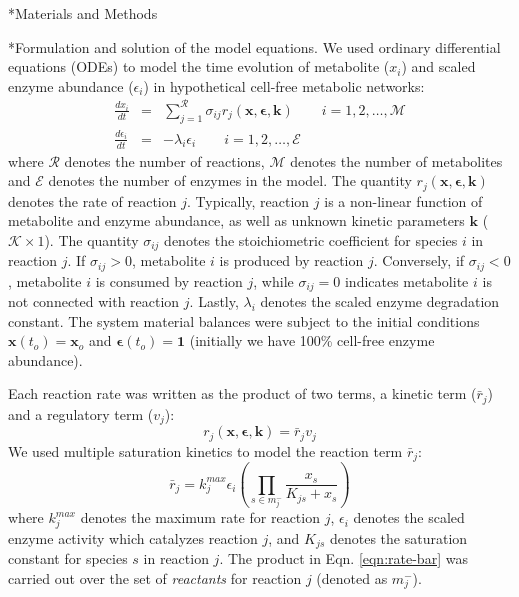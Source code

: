\documentclass[12pt]{article}
\makeatletter
\renewcommand\subsection{\@startsection
	{subsection}{2}{0mm}
	{-0.05in}
	{-0.5\baselineskip}
	{\normalfont\normalsize\bfseries}}
\renewcommand\section{\@startsection
	{subsection}{2}{0mm}
	{-0.2in}
	{0.05\baselineskip}
	{\normalfont\large\bfseries}}
\makeatother
\begin{document}
\clearpage

\section*{Materials and Methods}

\subsection*{Formulation and solution of the model equations.}
We used ordinary differential equations (ODEs) to model the time evolution of metabolite ($x_{i}$) and scaled enzyme abundance ($\epsilon_{i}$) in hypothetical cell-free metabolic networks:
\begin{eqnarray}
	\frac{dx_{i}}{dt} & = & \sum_{j = 1}^{\mathcal{R}}\sigma_{ij}r_{j}\left(\mathbf{x},\mathbf{\epsilon},\mathbf{k}\right)\qquad{i=1,2,\hdots,\mathcal{M}}\\
	\frac{d\epsilon_{i}}{dt} & = & -\lambda_{i}\epsilon_{i}\qquad{i = 1,2,\hdots,\mathcal{E}}
\end{eqnarray}where $\mathcal{R}$ denotes the number of reactions, $\mathcal{M}$ denotes the number of metabolites and $\mathcal{E}$ denotes the number of enzymes in the model. 
The quantity $r_{j}\left(\mathbf{x},\mathbf{\epsilon},\mathbf{k}\right)$ denotes the rate of reaction $j$. 
Typically, reaction $j$ is a non-linear function of metabolite and enzyme abundance, as well as unknown kinetic parameters $\mathbf{k}$ ($\mathcal{K}\times{1}$). 
The quantity $\sigma_{ij}$ denotes the stoichiometric coefficient for species $i$ in reaction $j$. 
If $\sigma_{ij}>0$, metabolite $i$ is produced by reaction $j$. 
Conversely, if $\sigma_{ij}<0$, metabolite $i$ is consumed by reaction $j$, while $\sigma_{ij} = 0$ indicates metabolite $i$ is not connected with reaction $j$. 
Lastly, $\lambda_{i}$ denotes the scaled enzyme degradation constant. 
The system material balances were subject to the initial conditions $\mathbf{x}\left(t_{o}\right) = \mathbf{x}_{o}$ and $\mathbf{\epsilon}\left(t_{o}\right) = \mathbf{1}$ (initially we have 100\% cell-free enzyme abundance). 

Each reaction rate was written as the product of two terms, a kinetic term ($\bar{r}_{j}$) and a regulatory term ($v_{j}$):
\begin{equation}\label{eqn:rate-factor}
	r_{j}\left(\mathbf{x},\mathbf{\epsilon},\mathbf{k}\right) = \bar{r}_{j}v_{j}
\end{equation}
We used multiple saturation kinetics to model the reaction term $\bar{r}_{j}$:
\begin{equation}\label{eqn:rate-bar}
	\bar{r}_{j} = k_{j}^{max}\epsilon_{i}\left(\prod_{s\in{m_{j}^{-}}}\frac{x_{s}}{K_{js} + x_{s}}\right)
\end{equation}
where $k_{j}^{max}$ denotes the maximum rate for reaction $j$, $\epsilon_{i}$ denotes the scaled enzyme activity which catalyzes reaction $j$, and
$K_{js}$ denotes the saturation constant for species $s$ in reaction $j$. 
The product in Eqn. \eqref{eqn:rate-bar} was carried out over the set of \textit{reactants} for reaction $j$ (denoted as $m_{j}^{-}$). 
\end{document}
